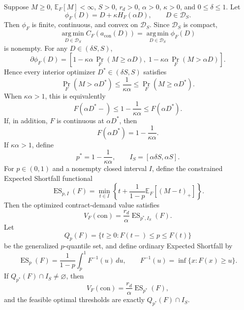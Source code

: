 \documentclass[Times1COL]{WileyNJDv5}
\begin{document}
\begin{proposition}
\label{prop:contract-optimization}
Suppose $M\geq0$, $\mathbb{E}_F[M]<\infty$, $S>0$, $r_d>0$, $\alpha>0$, $\kappa>0$, and $0\leq\delta\leq1$. Let
\begin{equation}
\label{eq:contract-objective}
\phi_F(D)=D+\kappa H_F(\alpha D),
\qquad D\in\mathcal{D}_S.
\end{equation}
Then $\phi_F$ is finite, continuous, and convex on $\mathcal{D}_S$.
Since $\mathcal{D}_S$ is compact,
\[
\operatorname*{arg\,min}_{D\in\mathcal{D}_S}
C_F\!\left(a_{\mathrm{con}}(D)\right)
=
\operatorname*{arg\,min}_{D\in\mathcal{D}_S}
\phi_F(D)
\]
is nonempty. For any $D\in(\delta S,S)$,
\[
\partial\phi_F(D)
=
\left[
1-\kappa\alpha\,\Pr_F(M\geq\alpha D),
\;
1-\kappa\alpha\,\Pr_F(M>\alpha D)
\right].
\]
Hence every interior optimizer $D^\ast\in(\delta S,S)$ satisfies
\[
\Pr_F(M>\alpha D^\ast)
\leq
\frac{1}{\kappa\alpha}
\leq
\Pr_F(M\geq\alpha D^\ast).
\]
When $\kappa\alpha>1$, this is equivalently
\begin{equation}
\label{eq:contract-quantile}
F(\alpha D^\ast-)
\leq
1-\frac{1}{\kappa\alpha}
\leq
F(\alpha D^\ast).
\end{equation}
If, in addition, $F$ is continuous at $\alpha D^\ast$, then
\[
F(\alpha D^\ast)
=
1-\frac{1}{\kappa\alpha}.
\]
If $\kappa\alpha>1$, define
\[
p^\ast=1-\frac{1}{\kappa\alpha},
\qquad
I_S=[\alpha\delta S,\alpha S].
\]
For $p\in(0,1)$ and a nonempty closed interval $I$, define the
constrained Expected Shortfall functional
\[
\operatorname{ES}_{p,I}(F)
=
\min_{t\in I}
\left\{
t+\frac{1}{1-p}\mathbb{E}_F[(M-t)_+]
\right\}.
\]
Then the optimized contract-demand value satisfies
\begin{equation}
\label{eq:contract-constrained-es}
V_F(\mathrm{con})
=
\frac{r_d}{\alpha}
\operatorname{ES}_{p^\ast,I_S}(F).
\end{equation}
Let
\[
Q_p(F)=\{t\geq0:F(t-)\leq p\leq F(t)\}
\]
be the generalized $p$-quantile set, and define ordinary Expected
Shortfall by
\[
\operatorname{ES}_p(F)
=
\frac{1}{1-p}\int_p^1F^{-1}(u)\,du,
\qquad
F^{-1}(u)=\inf\{x:F(x)\geq u\}.
\]
If $Q_{p^\ast}(F)\cap I_S\neq\varnothing$, then
\begin{equation}
\label{eq:contract-es}
V_F(\mathrm{con})
=
\frac{r_d}{\alpha}\operatorname{ES}_{p^\ast}(F),
\end{equation}
and the feasible optimal thresholds are exactly
$Q_{p^\ast}(F)\cap I_S$.
\end{proposition}
\end{document}
